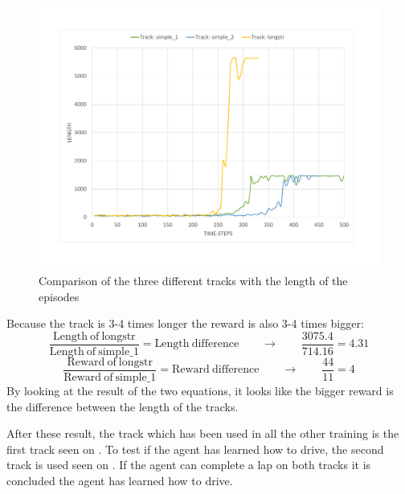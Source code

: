 \begin{figure}[H]
	\centering
	\includegraphics[width=1\textwidth]{Figures/Result/change_of_track_length_graph.pdf}
	\caption{Comparison of the three different tracks with the length of the episodes}
	\label{fig:change_of_track_length_graph}
\end{figure}

Because the track is 3-4 times longer the reward is also 3-4 times bigger:
\begin{equation}
\frac{\mathrm{Length \ of \ longstr}}{\mathrm{Length \ of \ simple\_1}} = \mathrm{Length \ difference}   \qquad \rightarrow \qquad \frac{3075.4}{714.16} = 4.31  
\end{equation}
\begin{equation}
\frac{\mathrm{Reward \ of \ longstr}}{\mathrm{Reward \ of \ simple\_1}} = \mathrm{Reward \ difference}   \qquad \rightarrow \qquad \frac{44}{11} = 4
\end{equation}
By looking at the result of the two equations, it looks like the bigger reward is the difference between the length of the tracks. 

After these result, the track which has been used in all the other training is the first track seen on . To test if the agent has learned how to drive, the second track is used seen on . If the agent can complete a lap on both tracks it is concluded the agent has learned how to drive.  
  



